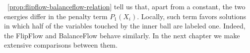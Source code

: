 ~\cref{prop:flipflow-balanceflow-relation} tell us that, apart  from a constant, the two energies differ in the penalty term $P_1(X_i)$. Locally, such term favors solutions in which half of the variables touched by the inner ball are labeled one. Indeed, the FlipFlow and BalanceFlow behave similarly. In the next chapter we make extensive comparisons between them.



%
%
%
%

